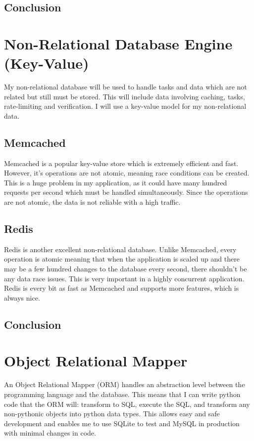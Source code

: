 \documentclass[a4paper,oneside,12pt,draft]{report}
\begin{document}
	\subsection{Conclusion}

	\section{Non-Relational Database Engine (Key-Value)}
	My non-relational database will be used to handle tasks and data which are not related but still must be stored. This will include data involving caching, tasks, rate-limiting and verification. I will use a key-value model for my non-relational data.

	\subsection{Memcached}
	Memcached is a popular key-value store which is extremely efficient and fast. However, it’s operations are not atomic, meaning race conditions can be created. This is a huge problem in my application, as it could have many hundred requests per second which must be handled simultaneously. Since the operations are not atomic, the data is not reliable with a high traffic.

	\subsection{Redis}
	Redis is another excellent non-relational database. Unlike Memcached, every operation is atomic meaning that when the application is scaled up and there may be a few hundred changes to the database every second, there shouldn't be any data race issues. This is very important in a highly concurrent application. Redis is every bit as fast as Memcached and supports more features, which is always nice.
	
	\subsection{Conclusion}

	\section{Object Relational Mapper}
	An Object Relational Mapper (ORM) handles an abstraction level between the programming language and the database. This means that I can write python code that the ORM will: transform to SQL, execute the SQL, and transform any non-pythonic objects into python data types. This allows easy and safe development and enables me to use SQLite to test and MySQL in production with minimal changes in code.
\end{document}

